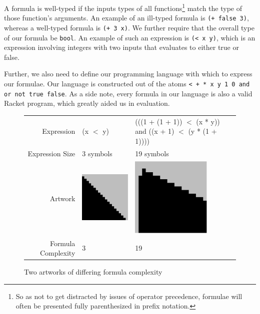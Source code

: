 \documentclass[11pt]{article}
\begin{document}
A formula is well-typed if the inputs types of all functions\footnote{So as not
to get distracted by issues of operator precedence, formulae will often be
presented fully parenthesized in prefix notation.} match the type of those
function's arguments.  An example of an ill-typed formula is {\tt (+ false 3)},
whereas a well-typed formula is {\tt (+ 3 x)}.  We further require that the
overall type of our formula be {\tt bool}.  An example of such an expression is
{\tt (< x y)}, which is an expression involving integers with two inputs that
evaluates to either true or false.

Further, we also need to define our programming language with which to express
our formulae.  Our language is constructed out of the atoms {\tt < + * x y 1 0
and or not true false}.  As a side note, every formula in our language is also
a valid Racket program\cite{LittleSchemer}, which greatly aided us in
evaluation.  

\begin{figure}
\begin{center}
\begin{tabular}{r | p{2in}   p{2in}}
Expression & (x $<$ y) &
(((1 + (1 + 1)) $<$  (x * y)) and 
          ((x + 1) $<$ (y * (1 + 1)))) \\
Expression Size & 3 symbols & 19 symbols\\
  Artwork & \includegraphics[width=1.5in]{../presentation/simple.png} &
  \includegraphics[width=1.5in]{../presentation/complex.png} \\
Formula Complexity& 3 &
19
\end{tabular}
\end{center}

\caption{Two artworks of differing formula complexity}
\end{figure}
\end{document}
